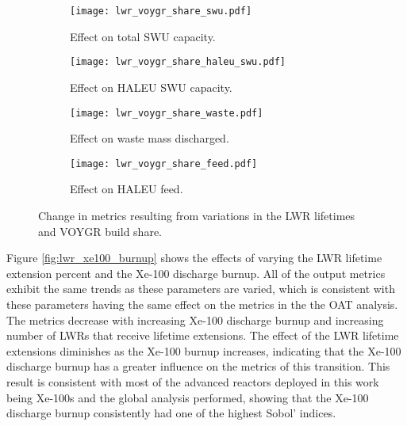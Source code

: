 \begin{figure}   
    \begin{subfigure}[t]{0.48\textwidth}
        \centering
        \texttt{[image: lwr\_voygr\_share\_swu.pdf]}
        \caption{Effect on total SWU capacity.}
        \label{fig:lwr_voygr_share_swu}
    \end{subfigure}
    \hfill
    \begin{subfigure}[t]{0.48\textwidth}
        \centering
        \texttt{[image: lwr\_voygr\_share\_haleu\_swu.pdf]}
        \caption{Effect on HALEU SWU capacity.}
        \label{fig:lwr_voygr_share_haleu_swu}
    \end{subfigure}   
    \begin{subfigure}[t]{0.48\textwidth}
        \centering
        \texttt{[image: lwr\_voygr\_share\_waste.pdf]}
        \caption{Effect on waste mass discharged.}
        \label{fig:lwr_voygr_share_waste}
    \end{subfigure}
    \hfill
    \begin{subfigure}[t]{0.48\textwidth}
        \centering
        \texttt{[image: lwr\_voygr\_share\_feed.pdf]}
        \caption{Effect on HALEU feed.}
        \label{fig:lwr_voygr_share_feed}
    \end{subfigure}
    \caption{Change in metrics resulting from variations in the 
    LWR lifetimes and VOYGR build share.}
    \label{fig:lwr_voygr_share}
\end{figure}

Figure \ref{fig:lwr_xe100_burnup} shows the effects of varying the 
\gls{LWR} lifetime extension percent and the Xe-100 discharge 
burnup. All of the output metrics exhibit the same trends as these 
parameters are varied, which is consistent with these parameters having 
the same effect on the metrics in the the \gls{OAT} analysis. The metrics 
decrease with increasing 
Xe-100 discharge burnup and increasing number of \glspl{LWR} that 
receive lifetime extensions. The effect of the \gls{LWR} lifetime 
extensions diminishes as the Xe-100 burnup increases, indicating that 
the Xe-100 discharge burnup has a greater influence on the metrics of 
this transition. This result is consistent with most of the advanced 
reactors deployed in this work being Xe-100s and the global analysis 
performed, showing that the Xe-100 discharge burnup consistently had one of 
the highest Sobol' indices. 



